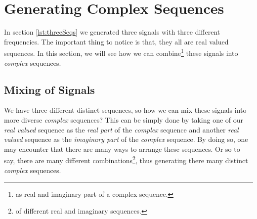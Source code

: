 \documentclass[../../course]{subfiles}
\begin{document}
\def\freqXOne{28}
\def\freqXTwo{56}
\def\freqXThree{56.1}

\section{Generating Complex Sequences} \label{sec:wrkGenCompSeqs}

In section \ref{lst:threeSeqs} we generated three signals with three different
frequencies. The important thing to notice is that, they all are real valued
sequences. In this section, we will see how we can combine\footnote{as real and
imaginary part of a complex sequence.} these signals into \emph{complex} sequences.

\subsection{Mixing of Signals}

We have three different distinct sequences, so how we can mix these signals into
more diverse \emph{complex} sequences? This can be simply done by taking one of our
\emph{real valued} sequence as the \emph{real part} of the \emph{complex} sequence
and another \emph{real valued} sequence as the \emph{imaginary part} of the
\emph{complex} sequence. By doing so, one may encounter that there are many ways
to arrange these sequences. Or so to say, there are many different combinations\footnote{of
different real and imaginary sequences.}, thus generating there many distinct \emph{complex}
sequences.
\end{document}
